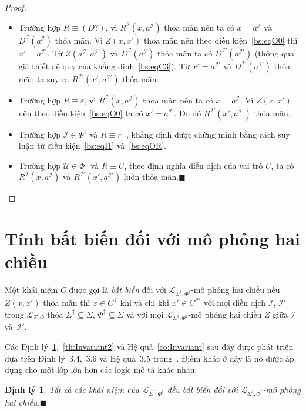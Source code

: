 \documentclass[12pt,a4paper,twoside]{report}
\newcommand{\mL}		{\mathcal{L}}
\newcommand{\mI}		{\mathcal{I}}
\newcommand{\mU}		{\mathcal{U}}
\newcommand{\SigmaDag}	{\Sigma^\dag}
\newcommand{\PhiDag}	{\Phi^\dag}
\newcommand{\mLSP}		{\mL_{\Sigma,\Phi}}
\newcommand{\mLSPD}		{\mL_{\Sigma^\dag,\Phi^\dag}}
\newcommand{\myend}		{\mbox{}\hfill\mbox{{\scriptsize$\!\blacksquare$}}}
\renewcommand{\qedsymbol}{\myend}
\newtheorem{Theorem}{Định lý}[chapter]
\theoremstyle{definition}
\begin{document}
\begin{proof}
\begin{itemize}
  \item Trường hợp $R \equiv (D?)$, vì $R^\mI(x,a^\mI)$ thỏa mãn nên ta có $x=a^\mI$ và $D^\mI(a^\mI)$ thỏa mãn. Vì $Z(x,x')$ thỏa mãn nên theo điều kiện~\eqref{bs:eqO0} thì $x' = a^{\mI'}$. Từ $Z(a^\mI, a^{\mI'})$ và $D^\mI(a^\mI)$ thỏa mãn ta có $D^{\mI'}(a^{\mI'})$
  (thông qua giả thiết đệ quy của khẳng định~\eqref{bs:eqC3}). Từ $x'=a^{\mI'}$ và $D^{\mI'}(a^{\mI'})$ thỏa mãn ta suy ra $R^{\mI'}(x',a^{\mI'})$ thỏa mãn.
  
  \item Trường hợp $R \equiv \varepsilon$, vì $R^\mI(x,a^\mI)$ thỏa mãn nên ta có $x=a^\mI$. Vì $Z(x,x')$ nên theo điều kiện~\eqref{bs:eqO0} ta có $x'=a^{\mI'}$. Do đó $R^{\mI'}(x',a^{\mI'})$ thỏa mãn.
  
  \item Trường hợp $\mI \in \PhiDag$ và $R \equiv r^-$, khẳng định được chứng minh bằng cách suy luận từ điều kiện~\eqref{bs:eqI1} và~\eqref{bs:eqOR}.
  
  \item Trường hợp $\mU \in \PhiDag$ và $R \equiv U$, theo định nghĩa diễn dịch của vai trò $U$, ta  có $R^\mI(x,a^\mI)$ và $R^{\mI'}(x',a^{\mI'})$ luôn thỏa mãn.\myend
\end{itemize}
\renewcommand{\qedsymbol}{}  
\end{proof}

\vspace{-5em}
\section{Tính bất biến đối với mô phỏng hai chiều}
Một khái niệm $C$ được gọi là {\em bất biến} đối với $\mLSPD$-mô phỏng hai chiều nếu $Z(x, x')$ thỏa mãn thì $x \in C^\mI$ khi và chỉ khi $x' \in C^{\mI'}$ với mọi diễn dịch $\mI$, $\mI'$ trong $\mLSP$ thỏa $\SigmaDag \subseteq \Sigma$, $\PhiDag \subseteq \Sigma$ và với mọi $\mLSPD$-mô phỏng hai chiều $Z$ giữa $\mI$ và~$\mI'$.

Các Định lý~\ref{th:Invariant},~\ref{th:Invariant2} và Hệ quả~\ref{co:Invariant} sau đây được phát triển dựa trên Định lý~3.4,~3.6 và Hệ quả~3.5 trong~\cite{Divroodi2011B}. Điểm khác ở đây là nó được áp dụng cho một lớp lớn hơn các logic mô tả khác nhau.

\begin{Theorem}
\label{th:Invariant}
Tất cả các khái niệm của $\mLSPD$ đều bất biến đối với $\mLSPD$-mô phỏng hai chiều.\myend
\end{Theorem}
\end{document}
